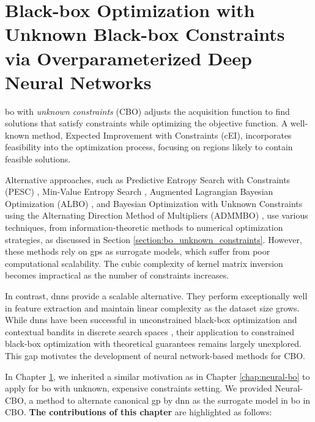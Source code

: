 \chapter{Black-box Optimization with Unknown Black-box Constraints via Overparameterized Deep Neural Networks} %

\label{chap:neural-cbo} %

\acl{bo} with \textit{unknown constraints} (CBO) adjusts the acquisition function to find solutions that satisfy constraints while optimizing the objective function. A well-known method, Expected Improvement with Constraints (cEI), incorporates feasibility into the optimization process, focusing on regions likely to contain feasible solutions.

Alternative approaches, such as Predictive Entropy Search with Constraints (PESC) \citep{hernandez2015predictive}, Min-Value Entropy Search \citep{takeno2022sequential}, Augmented Lagrangian Bayesian Optimization (ALBO) \citep{gramacy2016modeling}, and Bayesian Optimization with Unknown Constraints using the Alternating Direction Method of Multipliers (ADMMBO) \citep{ariafar2019admmbo}, use various techniques, from information-theoretic methods to numerical optimization strategies, as discussed in Section \ref{section:bo_unknown_constraints}. However, these methods rely on \acp{gp} as surrogate models, which suffer from poor computational scalability. The cubic complexity of kernel matrix inversion becomes impractical as the number of constraints increases.

In contrast, \acp{dnn} provide a scalable alternative. They perform exceptionally well in feature extraction and maintain linear complexity as the dataset size grows. While \acp{dnn} have been successful in unconstrained black-box optimization \citep{snoek2015scalable} and contextual bandits in discrete search spaces \citep{zhou2020neural,zhang2021neural}, their application to constrained black-box optimization with theoretical guarantees remains largely unexplored. This gap motivates the development of neural network-based methods for CBO.

In Chapter \ref{chap:neural-cbo}, we inherited a similar motivation as in Chapter \ref{chap:neural-bo} to apply for \ac{bo} with unknown, expensive constraints setting. We provided Neural-CBO, a method to alternate canonical \ac{gp} by \ac{dnn} as the surrogate model in \ac{bo} in CBO. \textbf{The contributions of this chapter} are highlighted as follows:

